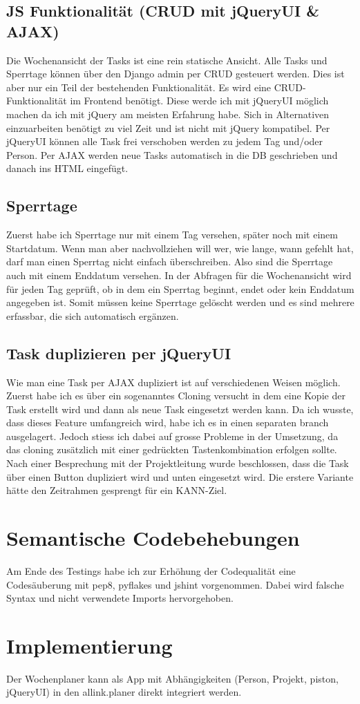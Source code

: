 \subsection{JS Funktionalität (CRUD mit jQueryUI \& AJAX) }
Die Wochenansicht der Tasks ist eine rein statische Ansicht.
Alle Tasks und Sperrtage können über den Django admin per CRUD gesteuert werden. Dies ist aber nur ein Teil der bestehenden Funktionalität.
Es wird eine CRUD-Funktionalität im Frontend benötigt. Diese werde ich mit jQueryUI möglich machen da ich mit jQuery am meisten Erfahrung habe.
Sich in Alternativen einzuarbeiten benötigt zu viel Zeit und ist nicht mit jQuery kompatibel.
Per jQueryUI können alle Task frei verschoben werden zu jedem Tag und/oder Person.
Per AJAX werden neue Tasks automatisch in die DB geschrieben und danach ins HTML eingefügt.
\subsection{Sperrtage}
Zuerst habe ich Sperrtage nur mit einem Tag versehen, später noch mit einem Startdatum.
Wenn man aber nachvollziehen will wer, wie lange, wann gefehlt hat, darf man einen Sperrtag nicht einfach überschreiben.
Also sind die Sperrtage auch mit einem Enddatum versehen. In der Abfragen für die Wochenansicht wird für jeden Tag geprüft,
ob in dem ein Sperrtag beginnt, endet oder kein Enddatum angegeben ist.
Somit müssen keine Sperrtage gelöscht werden und es sind mehrere erfassbar, die sich automatisch ergänzen.
\subsection{Task duplizieren per jQueryUI}
Wie man eine Task per AJAX dupliziert ist auf verschiedenen Weisen möglich.\\
Zuerst habe ich es über ein sogenanntes Cloning versucht in dem eine Kopie der Task erstellt wird und dann als neue Task eingesetzt werden kann.
Da ich wusste, dass dieses Feature umfangreich wird, habe ich es in einen separaten branch ausgelagert.
Jedoch stiess ich dabei auf grosse Probleme in der Umsetzung, da das cloning zusätzlich mit einer gedrückten Tastenkombination erfolgen sollte.
Nach einer Besprechung mit der Projektleitung wurde beschlossen, dass die Task über einen Button dupliziert wird und unten eingesetzt wird.
Die erstere Variante hätte den Zeitrahmen gesprengt für ein KANN-Ziel.
\section{Semantische Codebehebungen}
Am Ende des Testings habe ich zur Erhöhung der Codequalität eine Codesäuberung mit pep8, pyflakes und jshint vorgenommen. Dabei wird falsche Syntax und
nicht verwendete Imports hervorgehoben.
\section{Implementierung}
Der Wochenplaner kann als App mit Abhängigkeiten (Person, Projekt, piston, jQueryUI) in den allink.planer direkt integriert werden.
